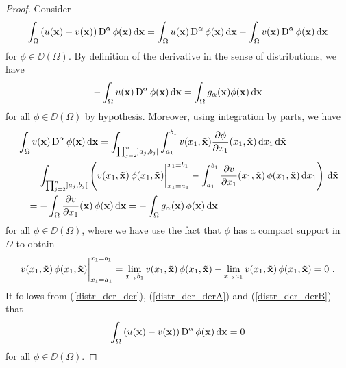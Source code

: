 \begin{proof}
Consider
\begin{equation} \label{distr_der_der}
\int_\Omega \left(u(\mathbf{x}) - v(\mathbf{x})\right) \operatorname{D}^\alpha
\phi(\mathbf{x}) \,\mathrm{d}{\mathbf{x}}
= \int_\Omega u(\mathbf{x}) \operatorname{D}^\alpha \phi(\mathbf{x}) \,\mathrm{d}{\mathbf{x}} -
\int_\Omega v(\mathbf{x}) \operatorname{D}^\alpha \phi(\mathbf{x}) \,\mathrm{d}{\mathbf{x}}
\end{equation}
for $\phi \in \DD(\Omega)$.
By definition of the derivative in the sense of distributions, we have
\begin{equation} \label{distr_der_derA}
-\int_\Omega u(\mathbf{x}) \operatorname{D}^\alpha \phi(\mathbf{x}) \,\mathrm{d}{\mathbf{x}} =
\int_\Omega g_\alpha(\mathbf{x}) \phi(\mathbf{x}) \,\mathrm{d}{\mathbf{x}}
\end{equation}
for all $\phi \in \DD(\Omega)$ by hypothesis.
Moreover, using integration by parts, we have
\begin{align}
&\int_\Omega v(\mathbf{x}) \operatorname{D}^\alpha \phi(\mathbf{x}) \,\mathrm{d}{\mathbf{x}} =
\int_{\prod_{j=2}^n]a_j,b_j[} \int_{a_1}^{b_1}
v(x_1,\tilde{\mathbf{x}}) \frac{\partial{\phi}}{\partial x_1}(x_1,\tilde{\mathbf{x}})
\,\mathrm{d}{x_1} \,\mathrm{d}{\tilde{\mathbf{x}}} \nonumber \\
&\quad = \int_{\prod_{j=2}^n]a_j,b_j[} \left( v(x_1, \tilde{\mathbf{x}})\,
\phi(x_1,\tilde{\mathbf{x}})\bigg|_{x_1=a_1}^{x_1=b_1}
- \int_{a_1}^{b_1} \frac{\partial{v}}{\partial x_1}(x_1,\tilde{\mathbf{x}})\,
\phi(x_1,\tilde{\mathbf{x}}) \,\mathrm{d}{x_1} \right) \,\mathrm{d}{\tilde{\mathbf{x}}}
\nonumber \\
&\quad = - \int_\Omega \frac{\partial{v}}{\partial x_1}(\mathbf{x})\,\phi(\mathbf{x}) \,\mathrm{d}{\mathbf{x}}
= - \int_\Omega g_\alpha(\mathbf{x})\,\phi(\mathbf{x}) \,\mathrm{d}{\mathbf{x}}
\label{distr_der_derB}
\end{align}
for all $\phi \in \DD(\Omega)$, where we have use the fact that $\phi$
has a compact support in $\Omega$ to obtain
\[
v(x_1,\tilde{\mathbf{x}})\, \phi(x_1,\tilde{\mathbf{x}})
\bigg|_{x_1=a_1}^{x_1=b_1}
= \lim_{x_ \to b_1} v(x_1,\tilde{\mathbf{x}})\, \phi(x_1,\tilde{\mathbf{x}})
- \lim_{x_ \to a_1} v(x_1,\tilde{\mathbf{x}})\, \phi(x_1,\tilde{\mathbf{x}}) = 0 \ .
\]
It follows from (\ref{distr_der_der}), (\ref{distr_der_derA}) and
(\ref{distr_der_derB}) that
\begin{equation} \label{distr_der_der2}
\int_\Omega \left(u(\mathbf{x}) - v(\mathbf{x})\right) \operatorname{D}^\alpha
\phi(\mathbf{x}) \,\mathrm{d}{\mathbf{x}} = 0
\end{equation}
for all $\phi \in \DD(\Omega)$.


\end{proof}

